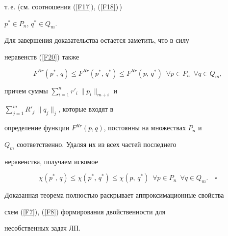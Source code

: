 т.\,е.{} (см. соотношения (\ref{F17}), (\ref{F18})\,)


$p^*\in P_n$, $q^*\in Q_m$.





Для завершения доказательства остается заметить, что в силу


неравенств (\ref{F20}) также


$$


F^{Rr}(p^*,\, q)\le F^{Rr}( p^*,\, q^*)\le


F^{Rr}(p,\, q^*)\ \; \forall p\in P_n\ \; \forall q\in Q_m,


$$


причем суммы $\sum\limits^n_{i=1} r'_i\, \| p_i\|_{m+i}$ и


$\sum\limits^m_{j=1} R'_j\,\| q_j\|_j$, которые входят в


определение функции $F^{Rr}(p, q)$, постоянны на множествах $P_n$ и


$Q_m$ соответственно. Удаляя их из всех частей последнего


неравенства, получаем искомое


$$


\chi(p^*,\,q)\le\chi(p^*,\,q^*)\le


\chi(p,\,q^*)\ \; \forall p\in P_n\ \; \forall q\in Q_m.\quad\square


$$





Доказанная теорема полностью раскрывает аппроксимационные свойства


схем (\ref{F7}), (\ref{F8}) формирования двойственности для


несобственных задач ЛП.








